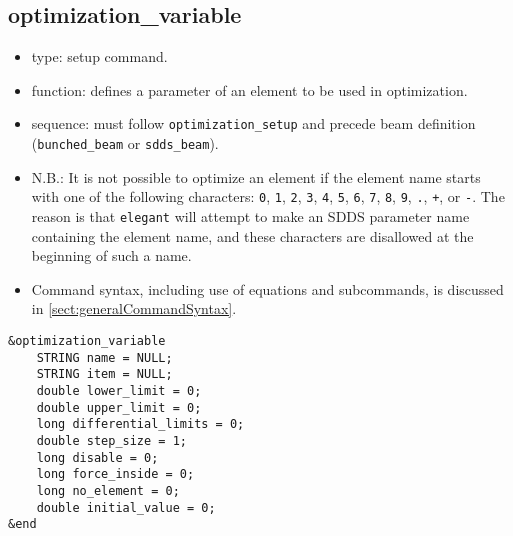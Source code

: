 \documentclass[11pt]{article}
\begin{document}
\subsection{optimization\_variable \label{subsec:optimizationvariable}}

\begin{itemize}
\item type: setup command.
\item function: defines a parameter of an element to be used in optimization.
\item sequence: must follow \verb|optimization_setup| and precede beam definition (\verb|bunched_beam| or \verb|sdds_beam|).
\item N.B.: It is not possible to optimize an element if the element name starts with one of the following
characters: 
\verb|0|, \verb|1|, \verb|2|, \verb|3|, \verb|4|, \verb|5|, \verb|6|, \verb|7|, \verb|8|,
\verb|9|, \verb|.|, \verb|+|, or \verb|-|.  The reason is that {\tt elegant} will attempt to 
make an SDDS parameter name containing the element name, and these characters are disallowed
at the beginning of such a name.
\item Command syntax, including use of equations and subcommands, is discussed in \ref{sect:generalCommandSyntax}.
\end{itemize}

\begin{verbatim}
&optimization_variable
    STRING name = NULL;
    STRING item = NULL;
    double lower_limit = 0;
    double upper_limit = 0;
    long differential_limits = 0;
    double step_size = 1;
    long disable = 0;
    long force_inside = 0;
    long no_element = 0;
    double initial_value = 0;
&end
\end{verbatim}
\end{document}
